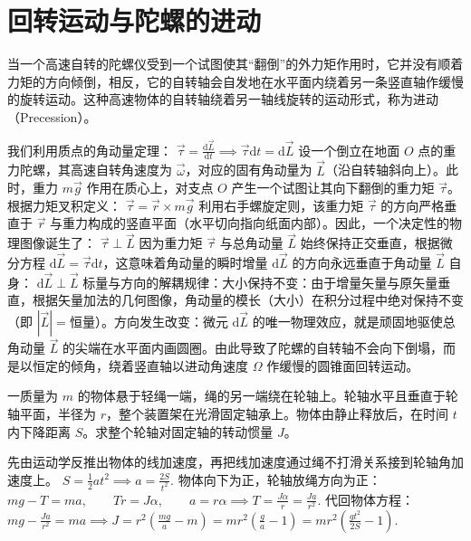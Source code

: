 
\section{回转运动与陀螺的进动}
\begin{definition}[进动]
当一个高速自转的陀螺仪受到一个试图使其“翻倒”的外力矩作用时，它并没有顺着力矩的方向倾倒，相反，它的自转轴会自发地在水平面内绕着另一条竖直轴作缓慢的旋转运动。这种高速物体的自转轴绕着另一轴线旋转的运动形式，称为进动（Precession）。
\end{definition}
我们利用质点的角动量定理： \(\vec{\tau} = \frac{\mathrm{d}\vec{L}}{\mathrm{d}t} \implies \vec{\tau}\mathrm{d}t = \mathrm{d}\vec{L}\) 设一个倒立在地面 $O$ 点的重力陀螺，其高速自转角速度为 $\vec{\omega}$，对应的固有角动量为 $\vec{L}$（沿自转轴斜向上）。此时，重力 $m\vec{g}$ 作用在质心上，对支点 $O$ 产生一个试图让其向下翻倒的重力矩 $\vec{\tau}$。根据力矩叉积定义： \(\vec{\tau} = \vec{r} \times m\vec{g}\) 利用右手螺旋定则，该重力矩 $\vec{\tau}$ 的方向严格垂直于 $\vec{r}$ 与重力构成的竖直平面（水平切向指向纸面内部）。因此，一个决定性的物理图像诞生了： \(\vec{\tau} \perp \vec{L}\) 因为重力矩 $\vec{\tau}$ 与总角动量 $\vec{L}$ 始终保持正交垂直，根据微分方程 $\mathrm{d}\vec{L} = \vec{\tau}\mathrm{d}t$，这意味着角动量的瞬时增量 $\mathrm{d}\vec{L}$ 的方向永远垂直于角动量 $\vec{L}$ 自身： \(\mathrm{d}\vec{L} \perp \vec{L}\) 标量与方向的解耦规律：大小保持不变：由于增量矢量与原矢量垂直，根据矢量加法的几何图像，角动量的模长（大小）在积分过程中绝对保持不变（即 $|\vec{L}| = \text{恒量}$）。方向发生改变：微元 $\mathrm{d}\vec{L}$ 的唯一物理效应，就是顽固地驱使总角动量 $\vec{L}$ 的尖端在水平面内画圆圈。由此导致了陀螺的自转轴不会向下倒塌，而是以恒定的倾角，绕着竖直轴以进动角速度 $\Omega$ 作缓慢的圆锥面回转运动。

\begin{exercise}
一质量为 \(m\) 的物体悬于轻绳一端，绳的另一端绕在轮轴上。轮轴水平且垂直于轮轴平面，半径为 \(r\)，整个装置架在光滑固定轴承上。物体由静止释放后，在时间 \(t\) 内下降距离 \(S\)。求整个轮轴对固定轴的转动惯量 \(J\)。
\end{exercise}
\begin{solution}
先由运动学反推出物体的线加速度，再把线加速度通过绳不打滑关系接到轮轴角加速度上。
 \(S=\frac12 at^2 \implies a=\frac{2S}{t^2}.\) 
物体向下为正，轮轴放绳方向为正：
 \(mg-T=ma,\qquad Tr=J\alpha,\qquad a=r\alpha\implies T=\frac{J\alpha}{r}=\frac{Ja}{r^2}.\) 
代回物体方程：
 \(mg-\frac{Ja}{r^2}=ma\implies J=r^2\left(\frac{mg}{a}-m\right) =mr^2\left(\frac{g}{a}-1\right)=mr^2\left(\frac{gt^2}{2S}-1\right).\) 
\end{solution}


